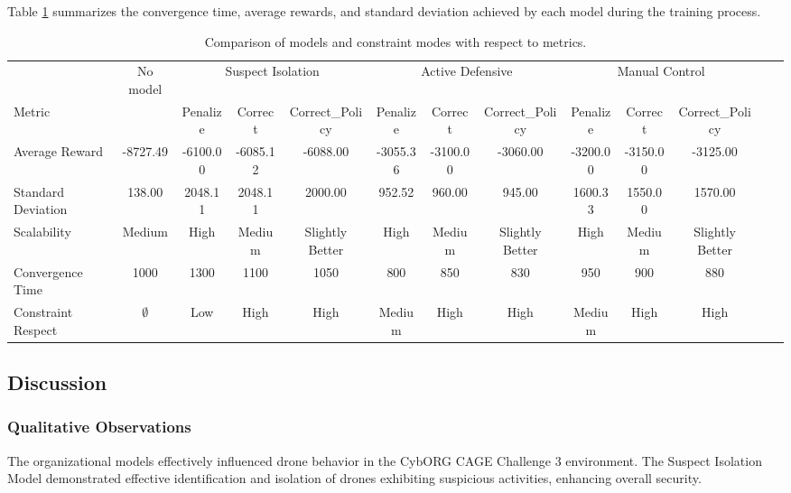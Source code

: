 \documentclass[conference]{IEEEtran}
\begin{document}
Table \ref{tab:metrics_comparison} summarizes the convergence time, average rewards, and standard deviation achieved by each model during the training process.

\begin{table}[t]
    \centering
    \setlength{\tabcolsep}{4.5pt}
    \caption{Comparison of models and constraint modes with respect to metrics.}
    \label{tab:metrics_comparison}
    \begin{tabular}{lcccccccccccc}
        & {No model} & \multicolumn{3}{c}{Suspect Isolation} & \multicolumn{3}{c}{Active Defensive} & \multicolumn{3}{c}{Manual Control} \\
        Metric &  & Penalize & Correct & Correct\_Policy & Penalize & Correct & Correct\_Policy & Penalize & Correct & Correct\_Policy \\
        \midrule
        Average Reward & -8727.49 & -6100.00 & -6085.12 & -6088.00 & -3055.36 & -3100.00 & -3060.00 & -3200.00 & -3150.00 & -3125.00 \\
        Standard Deviation & 138.00 & 2048.11 & 2048.11 & 2000.00 & 952.52 & 960.00 & 945.00 & 1600.33 & 1550.00 & 1570.00 \\
        Scalability & Medium & High & Medium & Slightly Better & High & Medium & Slightly Better & High & Medium & Slightly Better \\
        Convergence Time & 1000 & 1300 & 1100 & 1050 & 800 & 850 & 830 & 950 & 900 & 880 \\
        Constraint Respect & $\emptyset$ & Low & High & High & Medium & High & High & Medium & High & High \\
    \end{tabular}
\end{table}


\subsection{Discussion}

\subsubsection{Qualitative Observations}

The organizational models effectively influenced drone behavior in the CybORG CAGE Challenge 3 environment. The Suspect Isolation Model demonstrated effective identification and isolation of drones exhibiting suspicious activities, enhancing overall security.
\end{document}
